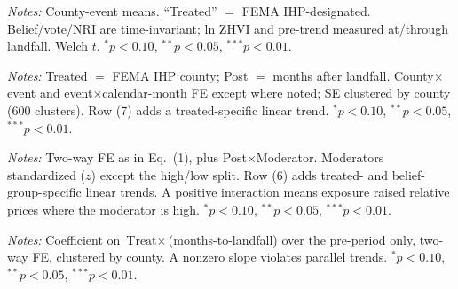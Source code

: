 \documentclass[12pt]{article}
\begin{document}
\FloatBarrier
\newpage
\begin{table}[htbp]\centering
\begin{threeparttable}
\caption{Balance: treated (hard-hit) vs.\ control counties}\label{tab:balance}\small

\begin{tablenotes}\small\item \textit{Notes:} County-event means. ``Treated'' $=$ FEMA IHP-designated.
Belief/vote/NRI are time-invariant; ln ZHVI and pre-trend measured at/through landfall.
Welch $t$. $^{*}p<0.10$, $^{**}p<0.05$, $^{***}p<0.01$.
\end{tablenotes}
\end{threeparttable}
\end{table}

\begin{table}[htbp]\centering
\begin{threeparttable}
\caption{Exposure difference-in-differences (DV $=\ln$ ZHVI)}\label{tab:did}\small

\begin{tablenotes}\small\item \textit{Notes:} Treated $=$ FEMA IHP county; Post $=$ months after
landfall. County$\times$event and event$\times$calendar-month FE except where noted; SE clustered
by county (600 clusters). Row (7) adds a treated-specific linear trend. $^{*}p<0.10$,
$^{**}p<0.05$, $^{***}p<0.01$.
\end{tablenotes}
\end{threeparttable}
\end{table}

\begin{table}[htbp]\centering
\begin{threeparttable}
\caption{Belief moderation: $\text{Treat}\times\text{Post}\times$Moderator}\label{tab:belief}\small

\begin{tablenotes}\small\item \textit{Notes:} Two-way FE as in Eq.~(1), plus Post$\times$Moderator.
Moderators standardized ($z$) except the high/low split. Row (6) adds treated- and
belief-group-specific linear trends. A positive interaction means exposure raised relative
prices where the moderator is high. $^{*}p<0.10$, $^{**}p<0.05$, $^{***}p<0.01$.
\end{tablenotes}
\end{threeparttable}
\end{table}

\begin{table}[htbp]\centering
\begin{threeparttable}
\caption{Pre-trend diagnostic (treated$-$control ln-ZHVI slope, pre-landfall)}\label{tab:pretrend}\small

\begin{tablenotes}\small\item \textit{Notes:} Coefficient on $\text{Treat}\times$(months-to-landfall)
over the pre-period only, two-way FE, clustered by county. A nonzero slope violates parallel
trends. $^{*}p<0.10$, $^{**}p<0.05$, $^{***}p<0.01$.
\end{tablenotes}
\end{threeparttable}
\end{table}
\end{document}
